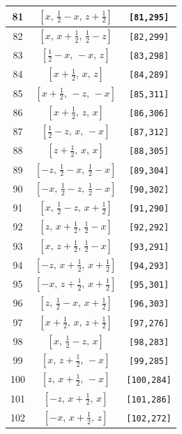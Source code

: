 \documentclass[fleqn,8pt]{jsarticle}
\begin{document}
\begin{longtable}{ccc}
81 & $\left[ x,\, \frac{1}{2} - x,\, z + \frac{1}{2} \right]$ & {\tt [81,295]} \\ \hline
82 & $\left[ x,\, x + \frac{1}{2},\, \frac{1}{2} - z \right]$ & {\tt [82,299]} \\ \hline
83 & $\left[ \frac{1}{2} - x,\, - x,\, z \right]$ & {\tt [83,298]} \\ \hline
84 & $\left[ x + \frac{1}{2},\, x,\, z \right]$ & {\tt [84,289]} \\ \hline
85 & $\left[ x + \frac{1}{2},\, - z,\, - x \right]$ & {\tt [85,311]} \\ \hline
86 & $\left[ x + \frac{1}{2},\, z,\, x \right]$ & {\tt [86,306]} \\ \hline
87 & $\left[ \frac{1}{2} - z,\, x,\, - x \right]$ & {\tt [87,312]} \\ \hline
88 & $\left[ z + \frac{1}{2},\, x,\, x \right]$ & {\tt [88,305]} \\ \hline
89 & $\left[ - z,\, \frac{1}{2} - x,\, \frac{1}{2} - x \right]$ & {\tt [89,304]} \\ \hline
90 & $\left[ - x,\, \frac{1}{2} - z,\, \frac{1}{2} - x \right]$ & {\tt [90,302]} \\ \hline
91 & $\left[ x,\, \frac{1}{2} - z,\, x + \frac{1}{2} \right]$ & {\tt [91,290]} \\ \hline
92 & $\left[ z,\, x + \frac{1}{2},\, \frac{1}{2} - x \right]$ & {\tt [92,292]} \\ \hline
93 & $\left[ x,\, z + \frac{1}{2},\, \frac{1}{2} - x \right]$ & {\tt [93,291]} \\ \hline
94 & $\left[ - z,\, x + \frac{1}{2},\, x + \frac{1}{2} \right]$ & {\tt [94,293]} \\ \hline
95 & $\left[ - x,\, z + \frac{1}{2},\, x + \frac{1}{2} \right]$ & {\tt [95,301]} \\ \hline
96 & $\left[ z,\, \frac{1}{2} - x,\, x + \frac{1}{2} \right]$ & {\tt [96,303]} \\ \hline
97 & $\left[ x + \frac{1}{2},\, x,\, z + \frac{1}{2} \right]$ & {\tt [97,276]} \\ \hline
98 & $\left[ x,\, \frac{1}{2} - z,\, x \right]$ & {\tt [98,283]} \\ \hline
99 & $\left[ x,\, z + \frac{1}{2},\, - x \right]$ & {\tt [99,285]} \\ \hline
100 & $\left[ z,\, x + \frac{1}{2},\, - x \right]$ & {\tt [100,284]} \\ \hline
101 & $\left[ - z,\, x + \frac{1}{2},\, x \right]$ & {\tt [101,286]} \\ \hline
102 & $\left[ - x,\, x + \frac{1}{2},\, z \right]$ & {\tt [102,272]} \\ \hline

\end{longtable}
\end{document}
